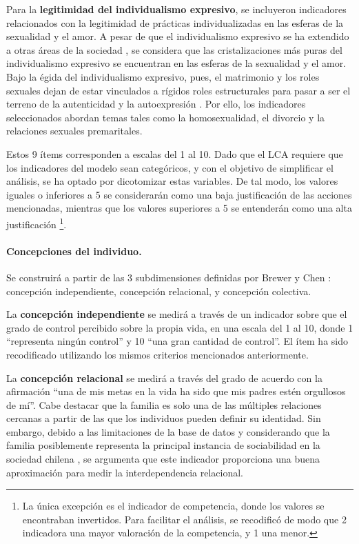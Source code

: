\documentclass[12pt,twoside]{templates/facsothesis}
\begin{document}
Para la \textbf{legitimidad del individualismo expresivo}, se incluyeron indicadores relacionados con la legitimidad de prácticas individualizadas en las esferas de la sexualidad y el amor. A pesar de que el individualismo expresivo se ha extendido a otras áreas de la sociedad \citep{gauthier2021}, se considera que las cristalizaciones más puras del individualismo expresivo se encuentran en las esferas de la sexualidad y el amor. Bajo la égida del individualismo expresivo, pues, el matrimonio y los roles sexuales dejan de estar vinculados a rígidos roles estructurales para pasar a ser el terreno de la autenticidad y la autoexpresión \citep{illouz2020}. Por ello, los indicadores seleccionados abordan temas tales como la homosexualidad, el divorcio y la relaciones sexuales premaritales.

Estos 9 ítems corresponden a escalas del 1 al 10. Dado que el LCA requiere que los indicadores del modelo sean categóricos, y con el objetivo de simplificar el análisis, se ha optado por dicotomizar estas variables. De tal modo, los valores iguales o inferiores a 5 se considerarán como una baja justificación de las acciones mencionadas, mientras que los valores superiores a 5 se entenderán como una alta justificación \footnote{La única excepción es el indicador de competencia, donde los valores se encontraban invertidos. Para facilitar el análisis, se recodificó de modo que 2 indicadora una mayor valoración de la competencia, y 1 una menor.}.

\hypertarget{concepciones-del-individuo.}{%
\paragraph{Concepciones del individuo.}\label{concepciones-del-individuo.}}

Se construirá a partir de las 3 subdimensiones definidas por Brewer y Chen \citeyearpar{brewer2007}: concepción independiente, concepción relacional, y concepción colectiva.

La \textbf{concepción independiente} se medirá a través de un indicador sobre que el grado de control percibido sobre la propia vida, en una escala del 1 al 10, donde 1 ``representa ningún control'' y 10 ``una gran cantidad de control''. El ítem ha sido recodificado utilizando los mismos criterios mencionados anteriormente.

La \textbf{concepción relacional} se medirá a través del grado de acuerdo con la afirmación ``una de mis metas en la vida ha sido que mis padres estén orgullosos de mí''. Cabe destacar que la familia es solo una de las múltiples relaciones cercanas a partir de las que los individuos pueden definir su identidad. Sin embargo, debido a las limitaciones de la base de datos y considerando que la familia posiblemente representa la principal instancia de sociabilidad en la sociedad chilena \citep{araujo2012}, se argumenta que este indicador proporciona una buena aproximación para medir la interdependencia relacional.
\end{document}
